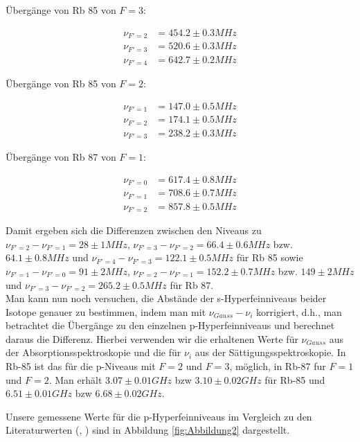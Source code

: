 \documentclass[a4paper,parskip]{scrartcl}
\begin{document}
Übergänge von Rb 85 von $F=3$:

\begin{align*}
\nu_{F'=2} &= 454.2 \pm 0.3 MHz \\
\nu_{F'=3} &= 520.6 \pm 0.3 MHz \\
\nu_{F'=4} &= 642.7 \pm 0.2 MHz  
\end{align*}

Übergänge von Rb 85 von $F=2$:

\begin{align*}
\nu_{F'=1} &= 147.0 \pm 0.5 MHz \\
\nu_{F'=2} &= 174.1 \pm 0.5 MHz \\
\nu_{F'=3} &= 238.2 \pm 0.3 MHz  
\end{align*}

Übergänge von Rb 87 von $F=1$:

\begin{align*}
\nu_{F'=0} &= 617.4 \pm 0.8 MHz \\
\nu_{F'=1} &= 708.6 \pm 0.7 MHz \\
\nu_{F'=2} &= 857.8 \pm 0.5 MHz  
\end{align*}

Damit ergeben sich die Differenzen zwischen den Niveaus zu $\nu_{F'=2} - \nu_{F'=1} = 28 \pm 1 MHz$, $\nu_{F'=3} - \nu_{F'=2} = 66.4 \pm 0.6MHz$ bzw. $64.1 \pm 0.8 MHz$ und $\nu_{F'=4} - \nu_{F'=3} = 122.1 \pm 0.5 MHz$ für Rb 85 sowie $\nu_{F'=1} - \nu_{F'=0} = 91 \pm 2 MHz$, $\nu_{F'=2} - \nu_{F'=1} = 152.2 \pm 0.7 MHz$ bzw. $149 \pm 2 MHz$ und  $\nu_{F'=3} - \nu_{F'=2} = 265.2 \pm 0.5 MHz$ für Rb 87.\\

Man  kann nun noch versuchen, die Abstände der s-Hyperfeinniveaus beider Isotope genauer zu bestimmen, indem man mit $\nu_{Gauss} - \nu_i$ korrigiert, d.h., man betrachtet die Übergänge zu den einzelnen p-Hyperfeinniveaus und berechnet daraus die Differenz. Hierbei verwenden wir die erhaltenen Werte für $\nu_{Gauss}$ aus der Absorptionsspektroskopie und die für $\nu_i$ aus der Sättigungsspektroskopie. In Rb-85 ist das für die p-Niveaus mit $F=2$ und $F=3$, möglich, in Rb-87 fur $F=1$ und $F=2$. Man erhält
$3.07 \pm 0.01 GHz$ bzw $3.10 \pm 0.02 GHz$ für Rb-85 und $6.51 \pm 0.01 GHz$ bzw $6.68 \pm 0.02 GHz$.

Unsere gemessene Werte für die p-Hyperfeinniveaus im Vergleich zu den Literaturwerten (\cite{Ref:1}, \cite{Ref:2}) sind in Abbildung \ref{fig:Abbildung2} dargestellt.
\end{document}
